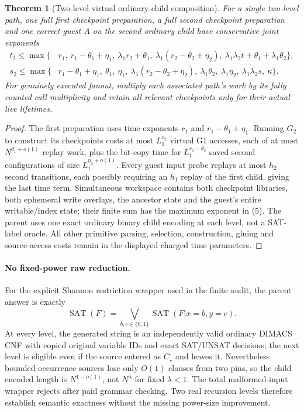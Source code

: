 \documentclass[11pt]{article}
\newtheorem{theorem}{Theorem}
\begin{document}
\begin{theorem}[Two-level virtual ordinary-child composition]
For a \emph{single} two-level path, one full first checkpoint preparation,
a full second checkpoint preparation and one correct guest $A$ on the
second ordinary child have conservative joint exponents
\begin{align}
t_2 \le \max\{&
r_1,\ r_1-\theta_1+\eta_1,\
\lambda_1r_2+\theta_1,\
\lambda_1(r_2-\theta_2+\eta_2),\
\lambda_1\lambda_2t+\theta_1+\lambda_1\theta_2\},
\tag{4}\\
s_2 \le\max\{&
r_1-\theta_1+\eta_1,\ \theta_1,\ \eta_1,\
\lambda_1(r_2-\theta_2+\eta_2),\
\lambda_1\theta_2,\ \lambda_1\eta_2,\
\lambda_1\lambda_2s,\ \kappa\}.
\tag{5}
\end{align}
For genuinely executed fanout, multiply each associated path's work
by its fully counted call multiplicity and retain all relevant
checkpoints only for their actual live lifetimes.
\end{theorem}
\begin{proof}
The first preparation uses time exponents $r_1$ and
$r_1-\theta_1+\eta_1$. Running $G_2$ to construct its checkpoints
costs at most $L_1^{r_2}$ virtual G1 accesses, each of at most
$N^{\theta_1+o(1)}$ replay work, plus the bit-copy time for
$L_1^{r_2-\theta_2}$ saved second configurations of size
$L_1^{\eta_2+o(1)}$. Every guest input probe replays at most $h_2$
second transitions, each possibly requiring an $h_1$ replay of
the first child, giving the last time term. Simultaneous workspace
contains both checkpoint libraries, both ephemeral write overlays,
the ancestor state and the guest's entire writable/index state;
their finite sum has the maximum exponent in (5).
The parent uses one exact ordinary binary child encoding at each
level, not a SAT-label oracle. All other primitive parsing,
selection, construction, gluing and source-access costs remain
in the displayed charged time parameters.
\end{proof}

\paragraph{No fixed-power raw reduction.}
For the explicit Shannon restriction wrapper used in the finite
audit, the parent answer is exactly
\[
\operatorname{SAT}(F)=
\bigvee_{b,c\in\{0,1\}}
\operatorname{SAT}(F|x=b,y=c).
\]
At every level, the generated string is an independently valid
ordinary DIMACS CNF with copied original variable IDs and exact
SAT/UNSAT decisions; the next level is eligible even if the source
entered as $C_\star$ and leaves it. Nevertheless bounded-occurrence
sources lose only $O(1)$ clauses from two pins, so the child encoded
length is $N^{1-o(1)}$, not $N^\lambda$ for fixed $\lambda<1$.
The total malformed-input wrapper rejects after paid grammar checking.
Two real recursion levels therefore establish semantic exactness
without the missing power-size improvement.
\end{document}
